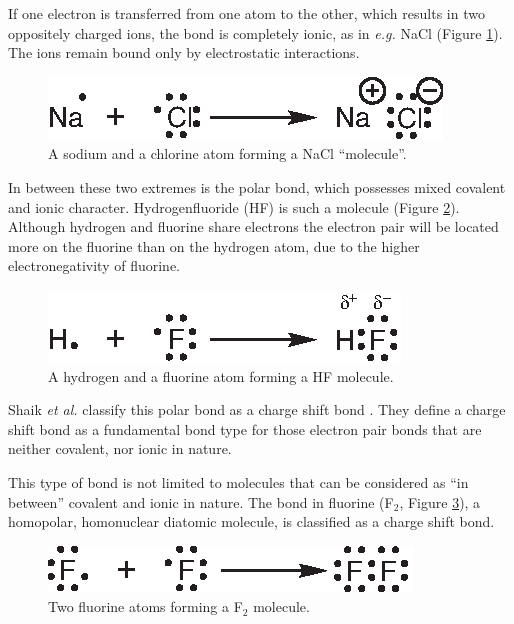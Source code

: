 If one electron is transferred from one atom to the other, which results in two oppositely charged ions, the bond is completely ionic, as in \textit{e.g.} NaCl (Figure \ref{ch3.fig.nacl}). The ions remain bound only by electrostatic interactions. 
\begin{figure}[ht]
\center
\includegraphics{dissociation/figures/nacl.eps}
\caption{A sodium and a chlorine atom forming a NaCl ``molecule''.}
\label{ch3.fig.nacl}
\end{figure}

In between these two extremes is the polar bond, which possesses mixed covalent and ionic character. Hydrogenfluoride (HF) is such a molecule (Figure \ref{ch3.fig.hf}). Although hydrogen and fluorine share electrons the electron pair will be located more on the fluorine than on the hydrogen atom, due to the higher electronegativity of fluorine.
\begin{figure}[ht]
\center
\includegraphics{dissociation/figures/hf.eps}
\caption{A hydrogen and a fluorine atom forming a HF molecule.}
\label{ch3.fig.hf}
\end{figure}
Shaik \textit{et al.} classify this polar bond as a charge shift bond \cite{cs1,cs2}. They define a charge shift bond as a fundamental bond type for those electron pair bonds that are neither covalent, nor ionic in nature. 

This type of bond is not limited to molecules that can be considered as ``in between'' covalent and ionic in nature. The bond in fluorine (F$_2$, Figure \ref{ch3.fig.f_twee}), a homopolar, homonuclear diatomic molecule, is classified as a charge shift bond.
\begin{figure}[h]
\center
\includegraphics{dissociation/figures/f_twee.eps}
\caption{Two fluorine atoms forming a F$_2$ molecule.}
\label{ch3.fig.f_twee} 
\end{figure}

